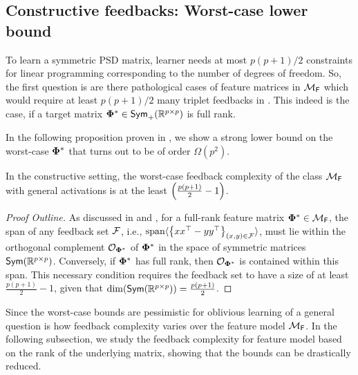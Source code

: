 \subsection{Constructive feedbacks: Worst-case lower bound}
To learn a symmetric PSD matrix, learner needs at most $p(p+1)/2$ constraints for linear programming corresponding to the number of degrees of freedom. So, the first question is are there pathological cases of feature matrices in ${\mathcal{M}}_{\textsf{F}}$ which would require at least $p(p+1)/2$ many triplet feedbacks in . This indeed is the case, if a target matrix $\boldsymbol{\Phi}^* \in \textsf{Sym}_{+}(\mathbb{R}^{p\times p})$ is full rank.


In the following proposition proven in , we show a strong lower bound on the worst-case $\boldsymbol{\Phi}^*$ that turns out to be of order $\Omega(p^2)$. %


\begin{proposition}\label{prop: worstcase} In the constructive setting, the worst-case feedback complexity of the class ${\mathcal{M}}_{\textsf{F}}$ with general activations
is at the least $ \left( {\frac{p(p+1)}{2} - 1} \right) $.
\end{proposition}
\begin{proof}[Proof Outline]  As discussed in  and , for a full-rank feature matrix $\boldsymbol{\Phi}^* \in {\mathcal{M}}_{\textsf{F}}$, the span of any feedback set ${\mathcal{F}}$, i.e., $\text{span}\langle{\ensuremath{\left\{xx^{\top} - yy^{\top}\right\}}_{(x,y) \in {\mathcal{F}}}}\rangle$, must lie within the orthogonal complement $\mathcal{O}_{\boldsymbol{\Phi}^*}$ of $\boldsymbol{\Phi}^*$ in the space of symmetric matrices $\textsf{Sym}(\mathbb{R}^{p\times p})$. Conversely, if $\boldsymbol{\Phi}^*$ has full rank, then $\mathcal{O}_{\boldsymbol{\Phi}^*}$ is contained within this span. This necessary condition requires the feedback set to have a size of at least $\frac{p(p+1)}{2} - 1$, given that $\dim(\textsf{Sym}(\mathbb{R}^{p\times p})) = \frac{p(p+1)}{2}$.
\end{proof}
Since the worst-case bounds are pessimistic for oblivious learning of  a general question is how feedback complexity varies over the feature model ${\mathcal{M}}_{\textsf{F}}$. In the following subsection, we study the feedback complexity for feature model based on the rank of the underlying matrix, showing that the bounds can be drastically reduced. 

